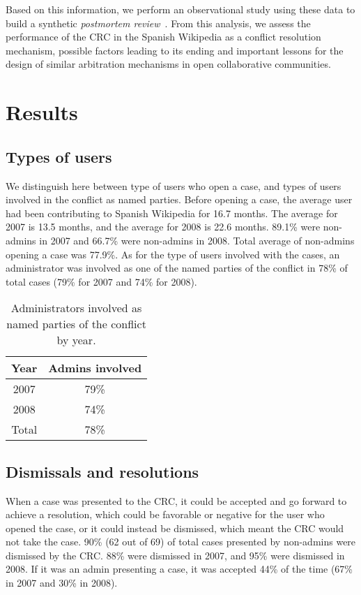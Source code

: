 \documentclass{sigchi}
\newcommand\tabhead[1]{\small\textbf{#1}}
\begin{document}
Based on this information, we perform an observational study using these data
to build a synthetic \textit{postmortem review}~\cite{Dingsoyr:postmortem}. From
this analysis, we assess the performance of the CRC in the Spanish Wikipedia
as a conflict resolution mechanism, possible factors leading to its ending and
important lessons for the design of similar arbitration mechanisms in open
collaborative communities.

\section{Results}

\subsection{Types of users}

We distinguish here between type of users who open a case, and types of users involved in the
conflict as named parties. Before opening a case, the average user had been contributing to
Spanish Wikipedia for 16.7 months. The average for 2007 is 13.5 months, and the average for 2008
is 22.6 months. 89.1\% were non-admins in 2007 and 66.7\% were non-admins in 2008. Total average
of non-admins opening a case was 77.9\%.
As for the type of users involved with the cases, an administrator was involved as one of the
named parties of the conflict in 78\% of total cases (79\% for 2007 and 74\% for 2008).

\begin{table}
  \centering
  \begin{tabular}{|c|c|}
    \hline
    \multicolumn{1}{|p{0.15\columnwidth}|}{\centering\tabhead{Year}} &
    \multicolumn{1}{|p{0.2\columnwidth}|}{\centering\tabhead{Admins involved}} \\
    \hline
    2007 & 79\% \\
    \hline
    2008 & 74\% \\
    \hline
    Total & 78\% \\
    \hline
  \end{tabular}
  \caption{Administrators involved as named parties of the conflict by year.}
  \label{tab:table1}
\end{table}

\subsection{Dismissals and resolutions}
When a case was presented to the CRC, it could be accepted and go forward to achieve a resolution,
which could be favorable or negative for the user who opened the case, or it could instead be
dismissed, which meant the CRC would not take the case. 90\% (62 out of 69) of total cases
presented by non-admins were dismissed by the CRC. 88\% were dismissed in 2007, and 95\% were
dismissed in 2008. If it was an admin presenting a case, it was accepted 44\% of the time (67\% 
in 2007 and 30\% in 2008). 
\end{document}
